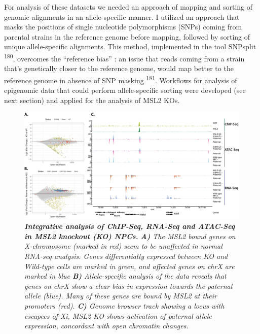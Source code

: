 \documentclass[11pt,twoside]{MPIthesis}
\theoremstyle{definition}
\theoremstyle{definition}
\theoremstyle{definition}
\theoremstyle{remark}
\begin{document}
For analysis of these datasets we needed an approach of mapping and
sorting of genomic alignments in an allele-specific manner. I utilized
an approach that masks the positions of single nucleotide polymorphisms
(SNPs) coming from parental strains in the reference genome before
mapping, followed by sorting of unique allele-specific alignments. This
method, implemented in the tool SNPsplit \textsuperscript{180},
overcomes the ``reference bias'' : an issue that reads coming from a
strain that's genetically closer to the reference genome, would map
better to the reference genome in absence of SNP masking
\textsuperscript{181}. Workflows for analysis of epigenomic data that
could perform allele-specific sorting were developed (see next section)
and applied for the analysis of MSL2 KOs.
\begin{figure}

{\centering \includegraphics[width=1\linewidth,height=0.4\textheight]{figures/results_fig7} 

}

\caption[Integrative analysis of ChIP-Seq, RNA-Seq and ATAC-Seq in MSL2 knockout (KO) NPCs]{\emph{\textbf{Integrative analysis of ChIP-Seq, RNA-Seq and
ATAC-Seq in MSL2 knockout (KO) NPCs.} \textbf{A)} The MSL2 bound genes
on X-chromosome (marked in red) seem to be unaffected in normal RNA-seq
analysis. Genes differentially expressed between KO and Wild-type cells
are marked in green, and affected genes on chrX are marked in blue
\textbf{B)} Allele-specific analysis of the data reveals that genes on
chrX show a clear bias in expression towards the paternal allele (blue).
Many of these genes are bound by MSL2 at their promoters (red).
\textbf{C)} Genome browser track showing a locus with escapees of Xi,
MSL2 KO shows activation of paternal allele expression, concordant with
open chromatin changes.}}\label{fig:unnamed-chunk-12}
\end{figure}
\end{document}
